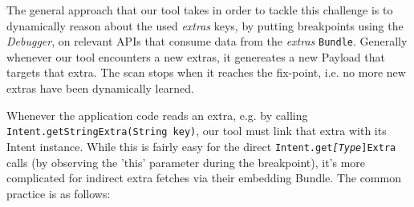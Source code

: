 The general approach that our tool takes in order to tackle this challenge
is to dynamically reason about the used \textit{extras} keys, by putting
breakpoints using the \textit{Debugger}, on relevant APIs that consume
data from the \textit{extras }\texttt{Bundle}. Generally whenever
our tool encounters a new extras, it genereates a new Payload that
targets that extra. The scan stops when it reaches the fix-point,
i.e. no more new extras have been dynamically learned.

Whenever the application code reads an extra, e.g. by calling \texttt{Intent.getStringExtra(String
key)}, our tool must link that extra with its Intent instance. While
this is fairly easy for the direct \texttt{Intent.get}\texttt{\textit{{[}Type}}\texttt{{]}Extra}
calls (by observing the 'this' parameter during the breakpoint), it's
more complicated for indirect extra fetches via their embedding Bundle.
The common practice is as follows:

